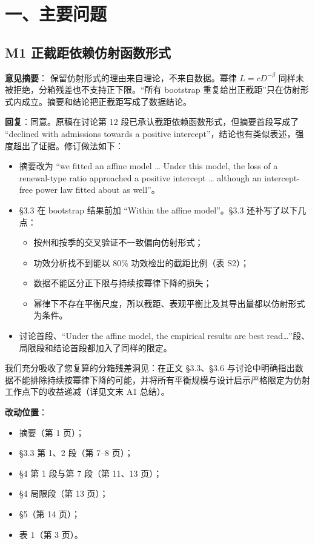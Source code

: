 \documentclass[UTF8,a4paper,11pt,fontset=none]{ctexart}
\providecommand{\tightlist}{\setlength{\itemsep}{1pt}\setlength{\parskip}{0pt}}
\begin{document}
\section*{一、主要问题}

\subsection*{M1 正截距依赖仿射函数形式}

\textbf{意见摘要}： 保留仿射形式的理由来自理论，不来自数据。幂律 \(L=cD^{-\beta}\) 同样未被拒绝，分箱残差也不支持正下限。``所有 bootstrap 重复给出正截距''只在仿射形式内成立。摘要和结论把正截距写成了数据结论。

\textbf{回复}：同意。原稿在讨论第 12 段已承认截距依赖函数形式，但摘要首段写成了 ``declined with admissions towards a positive intercept''，结论也有类似表述，强度超出了证据。修订做法如下：

\begin{itemize}
\tightlist
\item
  摘要改为 ``we fitted an affine model \ldots{} Under this model, the loss of a renewal-type ratio approached a positive intercept \ldots{} although an intercept-free power law fitted about as well''。
\item
  §3.3 在 bootstrap 结果前加 ``Within the affine model''。§3.3 还补写了以下几点：

  \begin{itemize}
  \tightlist
  \item
    按州和按季的交叉验证不一致偏向仿射形式；
  \item
    功效分析找不到能以 80\% 功效检出的截距比例（表 S2）；
  \item
    数据不能区分正下限与持续按幂律下降的损失；
  \item
    幂律下不存在平衡尺度，所以截距、表观平衡比及其导出量都以仿射形式为条件。
  \end{itemize}
\item
  讨论首段、``Under the affine model, the empirical results are best read\ldots{}''段、局限段和结论首段都加入了同样的限定。
\end{itemize}

我们充分吸收了您复算的分箱残差洞见：在正文 §3.3、§3.6 与讨论中明确指出数据不能排除持续按幂律下降的可能，并将所有平衡规模与设计启示严格限定为仿射工作点下的收益递减（详见文末 A1 总结）。

\textbf{改动位置}：

\begin{itemize}
\tightlist
\item
  摘要（第 1 页）；
\item
  §3.3 第 1、2 段（第 7--8 页）；
\item
  §4 第 1 段与第 7 段（第 11、13 页）；
\item
  §4 局限段（第 13 页）；
\item
  §5（第 14 页）；
\item
  表 1（第 3 页）。
\end{itemize}
\end{document}
